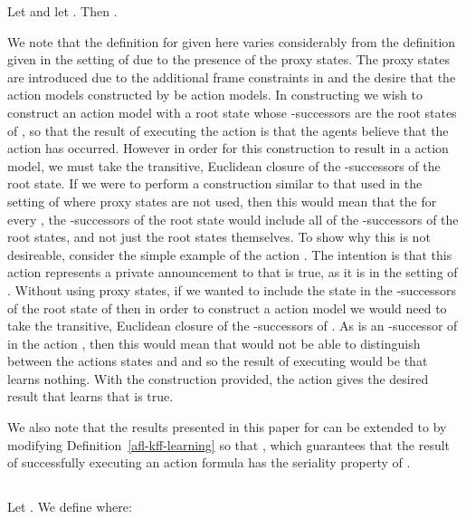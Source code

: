 \documentclass[twoside]{aiml14}
\begin{document}
  \begin{lemma}\label{afl-kff-exec}
      Let  and 
      let .
      Then .
  \end{lemma}

  We note that the definition for  given here varies considerably from
  the definition given in the setting of \classK{} due to the presence of the
  proxy states.  The proxy states are introduced due to the additional frame
  constraints in \classKFF{} and the desire that the action models constructed
  by  be  action models. In constructing
   we wish to construct an action model with a
  root state whose -successors are the root states of ,
  so that the result of executing the action  is that
  the agents  believe that the action  has occurred. However
  in order for this construction to result in a  action
  model, we must take the transitive, Euclidean closure of the
  -successors of the root state. If we were to perform a construction
  similar to that used in the setting of \classK{} where proxy states are not
  used, then this would mean that the for every , the
  -successors of the root state would include all of the
  -successors of the root states, and not just the root states
  themselves. To show why this is not desireable, consider the simple example
  of the action . The intention is that this
  action represents a private announcement to  that  is true, as
  it is in the setting of \classK{}. Without using proxy states, if we wanted to
  include the state  in the -successors of the root
  state of  then in order to construct a 
  action model we would need to take the transitive, Euclidean closure of the
  -successors of . As  is an
  -successor of  in the action , then
  this would mean that  would not be able to distinguish between the
  actions states  and  and so the result of
  executing  would be that  learns nothing. With the
  construction provided, the action  gives the
  desired result that  learns that  is true.

  We also note that the results presented in this paper for \classKFF{} can be
  extended to \classKD{} by modifying Definition~\ref{afl-kff-learning} so that
  , which guarantees that
  the result of successfully executing an action formula has the seriality
  property of \classKD{}.

  \subsection{\classS{}}

  \begin{definition}[Test]\label{afl-s-test}
      Let . 
      We define  where:
      
  \end{definition}
\end{document}
